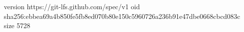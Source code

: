 version https://git-lfs.github.com/spec/v1
oid sha256:ebbea69a4b850fe5fb8ed070b80e150c5960726a236b91e47dbe0668cbcd083c
size 5728
